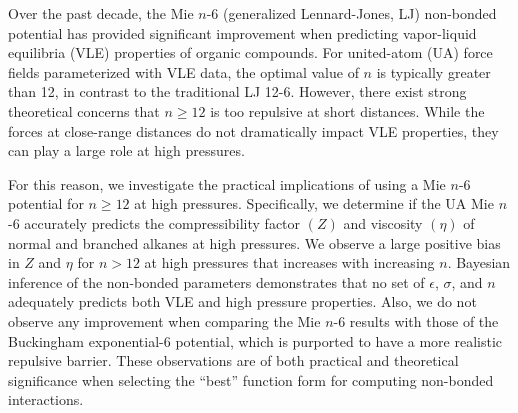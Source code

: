 \documentclass[11pt,a4paper]{article}
\begin{document}
	
	Over the past decade, the Mie $n$-6 (generalized Lennard-Jones, LJ) non-bonded potential has provided significant improvement when predicting vapor-liquid equilibria (VLE) properties of organic compounds. For united-atom (UA) force fields parameterized with VLE data, the optimal value of $n$ is typically greater than 12, in contrast to the traditional LJ 12-6. However, there exist strong theoretical concerns that $n \ge 12$ is too repulsive at short distances. While the forces at close-range distances do not dramatically impact VLE properties, they can play a large role at high pressures.
	
	
	For this reason, we investigate the practical implications of using a Mie $n$-6 potential for $n\ge12$ at high pressures. Specifically, we determine if the UA Mie $n$-6 accurately predicts the compressibility factor $(Z)$ and viscosity $(\eta)$ of normal and branched alkanes at high pressures. We observe a large positive bias in $Z$ and $\eta$ for $n>12$ at high pressures that increases with increasing $n$. Bayesian inference of the non-bonded parameters demonstrates that no set of $\epsilon$, $\sigma$, and $n$ adequately predicts both VLE and high pressure properties. Also, we do not observe any improvement when comparing the Mie $n$-6 results with those of the Buckingham exponential-6 potential, which is purported to have a more realistic repulsive barrier. These observations are of both practical and theoretical significance when selecting the ``best'' function form for computing non-bonded interactions.
	
\end{document}
